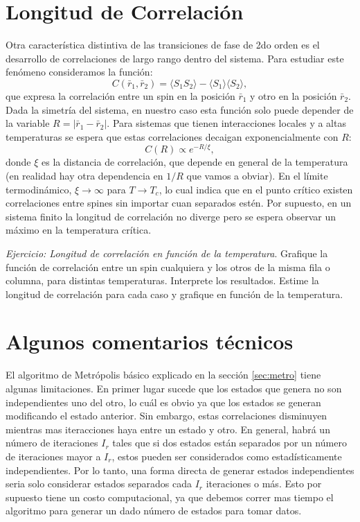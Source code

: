 \documentclass[a4paper,11pt,oneside]{article}
\newcommand{\mean}[1]{\langle #1 \rangle}
\begin{document}
\section{Longitud de Correlación}

Otra característica distintiva de las transiciones de fase de 2do orden 
es el desarrollo de
correlaciones de largo rango dentro del sistema. Para estudiar este fenómeno
consideramos la función:
\begin{equation}
    C(\bar r_1, \bar r_2) = \mean{S_1 S_2} - \mean{S_1}\mean{S_2},
\end{equation}
que expresa la correlación entre un spin en la posición $\bar r_1$ y otro en la
posición $\bar r_2$.
Dada la simetría del sistema, en nuestro caso
esta función solo puede depender de la variable $R=|\bar r_1 - \bar r_2|$. Para
sistemas que tienen interacciones locales y a altas temperaturas se espera que
estas correlaciones decaigan exponencialmente con $R$:
\begin{equation}
    C(R) \propto e^{-R/\xi},
\end{equation}
donde $\xi$ es la distancia de correlación, que depende en general de la
temperatura (en realidad hay otra dependencia en $1/R$ que vamos a obviar). En el límite termodinámico, $\xi \to \infty$ para $T\to T_c$, lo
cual indica que en el punto crítico existen correlaciones entre spines sin
importar cuan separados estén. Por supuesto, en un sistema finito la longitud
de correlación no diverge pero se espera observar un máximo en la temperatura
crítica.

\begin{mdframed}
\emph{Ejercicio: Longitud de correlación en función de la temperatura}.
Grafique la función de correlación entre un spin cualquiera 
y los otros de la misma fila o
columna, para distintas temperaturas. Interprete los resultados. 
Estime la longitud de correlación para cada caso y grafique en función de la
temperatura.
\end{mdframed}






\section{Algunos comentarios técnicos}
El algoritmo de Metrópolis básico explicado en la sección \ref{sec:metro} 
tiene algunas limitaciones. En primer lugar sucede que los estados que genera
no son independientes uno del otro, lo cuál es obvio ya que los estados se
generan modificando el estado anterior. Sin embargo, estas correlaciones 
disminuyen mientras mas iteracciones haya entre un estado y otro. En general,
habrá un número de iteraciones $I_r$ tales que si dos estados están separados
por un número de iteraciones mayor a $I_r$, estos pueden ser considerados como
estadísticamente independientes. Por lo tanto, una forma directa de generar
estados independientes seria solo considerar estados separados cada $I_r$
iteraciones o más. Esto por supuesto tiene un costo computacional, ya que
debemos correr mas tiempo el algoritmo para generar un dado número de estados
para tomar datos.
\end{document}

